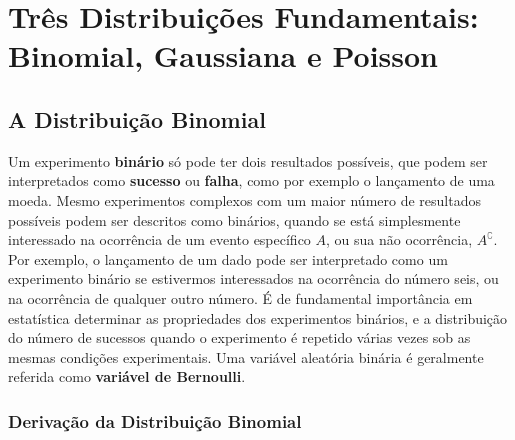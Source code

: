 \chapter{Três Distribuições Fundamentais: Binomial, Gaussiana e Poisson}

\section{A Distribuição Binomial}

Um experimento \textbf{binário} só pode ter dois resultados possíveis, que podem ser interpretados como \textbf{sucesso} ou \textbf{falha}, como por exemplo o lançamento de uma moeda. Mesmo experimentos complexos com um maior número de resultados possíveis podem ser descritos como binários, quando se está simplesmente interessado na ocorrência de um evento específico $A$, ou sua não ocorrência, $A^\complement$. Por exemplo, o lançamento de um dado pode ser interpretado como um experimento binário se estivermos interessados na ocorrência do número seis, ou na ocorrência de qualquer outro número. É de fundamental importância em estatística determinar as propriedades dos experimentos binários, e a distribuição do número de sucessos quando o experimento é repetido várias vezes sob as mesmas condições experimentais. Uma variável aleatória binária é geralmente referida como \textbf{variável de Bernoulli}.

\subsection{Derivação da Distribuição Binomial}

